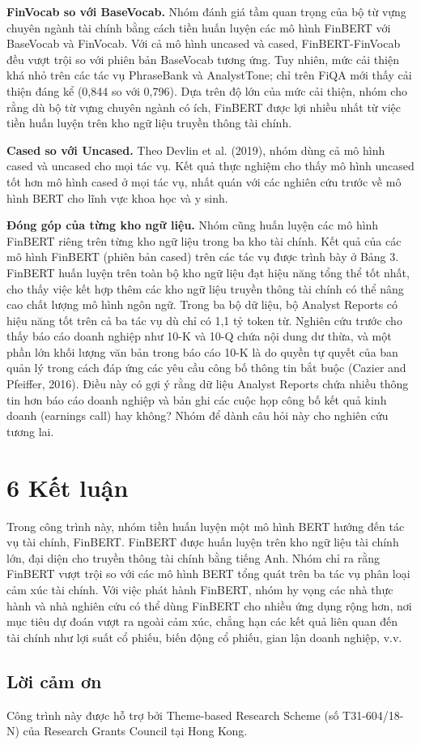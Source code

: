 \textbf{FinVocab so với BaseVocab.} Nhóm đánh giá tầm quan trọng của bộ từ vựng chuyên ngành tài chính bằng cách tiền huấn luyện các mô hình FinBERT với BaseVocab và FinVocab. Với cả mô hình uncased và cased, FinBERT-FinVocab đều vượt trội so với phiên bản BaseVocab tương ứng. Tuy nhiên, mức cải thiện khá nhỏ trên các tác vụ PhraseBank và AnalystTone; chỉ trên FiQA mới thấy cải thiện đáng kể (0,844 so với 0,796). Dựa trên độ lớn của mức cải thiện, nhóm cho rằng dù bộ từ vựng chuyên ngành có ích, FinBERT được lợi nhiều nhất từ việc tiền huấn luyện trên kho ngữ liệu truyền thông tài chính.

\textbf{Cased so với Uncased.} Theo Devlin et al. (2019), nhóm dùng cả mô hình cased và uncased cho mọi tác vụ. Kết quả thực nghiệm cho thấy mô hình uncased tốt hơn mô hình cased ở mọi tác vụ, nhất quán với các nghiên cứu trước về mô hình BERT cho lĩnh vực khoa học và y sinh.

\textbf{Đóng góp của từng kho ngữ liệu.} Nhóm cũng huấn luyện các mô hình FinBERT riêng trên từng kho ngữ liệu trong ba kho tài chính. Kết quả của các mô hình FinBERT (phiên bản cased) trên các tác vụ được trình bày ở Bảng 3. FinBERT huấn luyện trên toàn bộ kho ngữ liệu đạt hiệu năng tổng thể tốt nhất, cho thấy việc kết hợp thêm các kho ngữ liệu truyền thông tài chính có thể nâng cao chất lượng mô hình ngôn ngữ. Trong ba bộ dữ liệu, bộ Analyst Reports có hiệu năng tốt trên cả ba tác vụ dù chỉ có 1,1 tỷ token từ. Nghiên cứu trước cho thấy báo cáo doanh nghiệp như 10-K và 10-Q chứa nội dung dư thừa, và một phần lớn khối lượng văn bản trong báo cáo 10-K là do quyền tự quyết của ban quản lý trong cách đáp ứng các yêu cầu công bố thông tin bắt buộc (Cazier and Pfeiffer, 2016). Điều này có gợi ý rằng dữ liệu Analyst Reports chứa nhiều thông tin hơn báo cáo doanh nghiệp và bản ghi các cuộc họp công bố kết quả kinh doanh (earnings call) hay không? Nhóm để dành câu hỏi này cho nghiên cứu tương lai.

\section{6 Kết luận}

Trong công trình này, nhóm tiền huấn luyện một mô hình BERT hướng đến tác vụ tài chính, FinBERT. FinBERT được huấn luyện trên kho ngữ liệu tài chính lớn, đại diện cho truyền thông tài chính bằng tiếng Anh. Nhóm chỉ ra rằng FinBERT vượt trội so với các mô hình BERT tổng quát trên ba tác vụ phân loại cảm xúc tài chính. Với việc phát hành FinBERT, nhóm hy vọng các nhà thực hành và nhà nghiên cứu có thể dùng FinBERT cho nhiều ứng dụng rộng hơn, nơi mục tiêu dự đoán vượt ra ngoài cảm xúc, chẳng hạn các kết quả liên quan đến tài chính như lợi suất cổ phiếu, biến động cổ phiếu, gian lận doanh nghiệp, v.v.

\subsection{Lời cảm ơn}

Công trình này được hỗ trợ bởi Theme-based Research Scheme (số T31-604/18-N) của Research Grants Council tại Hong Kong.
